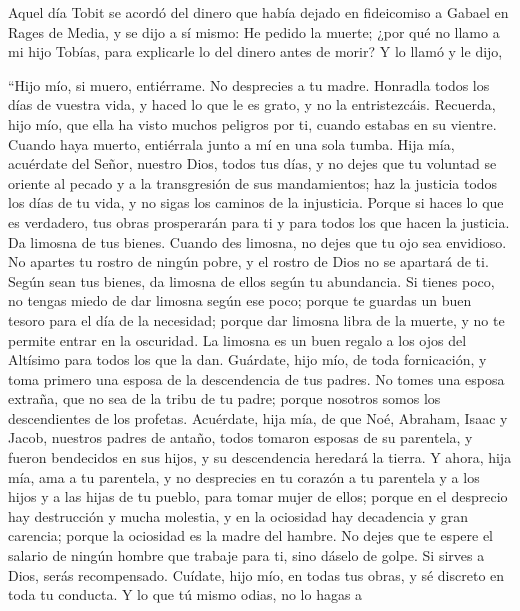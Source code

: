  Aquel día Tobit se acordó del dinero que había dejado en
fideicomiso a Gabael en Rages de Media,  y se dijo a sí
mismo: He pedido la muerte; ¿por qué no llamo a mi hijo Tobías, para
explicarle lo del dinero antes de morir?  Y lo llamó y le
dijo,

``Hijo mío, si muero, entiérrame. No desprecies a tu madre. Honradla
todos los días de vuestra vida, y haced lo que le es grato, y no la
entristezcáis.  Recuerda, hijo mío, que ella ha visto
muchos peligros por ti, cuando estabas en su vientre. Cuando haya
muerto, entiérrala junto a mí en una sola tumba.  Hija
mía, acuérdate del Señor, nuestro Dios, todos tus días, y no dejes que
tu voluntad se oriente al pecado y a la transgresión de sus
mandamientos; haz la justicia todos los días de tu vida, y no sigas los
caminos de la injusticia.  Porque si haces lo que es
verdadero, tus obras prosperarán para ti y para todos los que hacen la
justicia.  Da limosna de tus bienes. Cuando des limosna,
no dejes que tu ojo sea envidioso. No apartes tu rostro de ningún pobre,
y el rostro de Dios no se apartará de ti.  Según sean tus
bienes, da limosna de ellos según tu abundancia. Si tienes poco, no
tengas miedo de dar limosna según ese poco;  porque te
guardas un buen tesoro para el día de la necesidad; 
porque dar limosna libra de la muerte, y no te permite entrar en la
oscuridad.  La limosna es un buen regalo a los ojos del
Altísimo para todos los que la dan.  Guárdate, hijo mío,
de toda fornicación, y toma primero una esposa de la descendencia de tus
padres. No tomes una esposa extraña, que no sea de la tribu de tu padre;
porque nosotros somos los descendientes de los profetas. Acuérdate, hija
mía, de que Noé, Abraham, Isaac y Jacob, nuestros padres de antaño,
todos tomaron esposas de su parentela, y fueron bendecidos en sus hijos,
y su descendencia heredará la tierra.  Y ahora, hija mía,
ama a tu parentela, y no desprecies en tu corazón a tu parentela y a los
hijos y a las hijas de tu pueblo, para tomar mujer de ellos; porque en
el desprecio hay destrucción y mucha molestia, y en la ociosidad hay
decadencia y gran carencia; porque la ociosidad es la madre del hambre.
 No dejes que te espere el salario de ningún hombre que
trabaje para ti, sino dáselo de golpe. Si sirves a Dios, serás
recompensado. Cuídate, hijo mío, en todas tus obras, y sé discreto en
toda tu conducta.  Y lo que tú mismo odias, no lo hagas a

